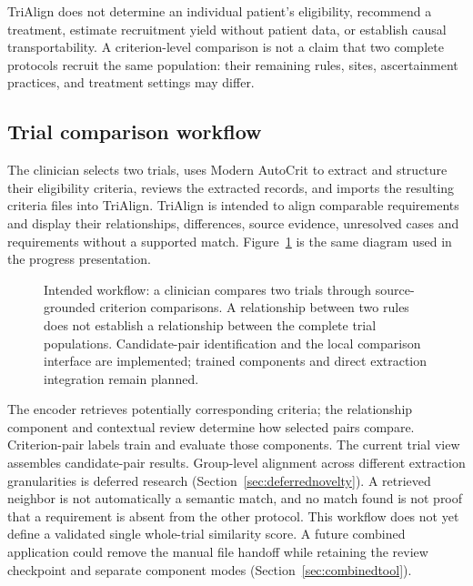 \documentclass[10pt,letterpaper]{article}
\begin{document}
TriAlign does not determine an individual patient's eligibility, recommend a
treatment, estimate recruitment yield without patient data, or establish
causal transportability. A criterion-level comparison is not a claim that
two complete protocols recruit the same population: their remaining rules,
sites, ascertainment practices, and treatment settings may differ.

\subsection{Trial comparison workflow}
\label{sec:trialworkflow}
The clinician selects two trials, uses Modern AutoCrit to extract and
structure their eligibility criteria, reviews the extracted records, and
imports the resulting criteria files into TriAlign. TriAlign is intended to
align comparable requirements and display their relationships, differences,
source evidence, unresolved cases and requirements without a supported
match. Figure~\ref{fig:trialworkflow} is the same diagram used in the progress
presentation.

\begin{figure}[htbp]
\centering
{}
\caption{Intended workflow: a clinician compares two trials through
source-grounded criterion comparisons. A relationship between two rules
does not establish a relationship between the complete trial populations.
Candidate-pair identification and the local comparison interface are implemented;
trained components and direct extraction integration remain planned.}
\label{fig:trialworkflow}
\end{figure}

The encoder retrieves potentially corresponding criteria; the relationship
component and contextual review determine how selected pairs compare.
Criterion-pair labels train and evaluate those components. The current trial view assembles candidate-pair results. Group-level alignment
across different extraction granularities is deferred research
(Section~\ref{sec:deferrednovelty}). A retrieved neighbor is not automatically
a semantic match, and no match found is not proof that a requirement is
absent from the other protocol. This workflow does not yet define a validated
single whole-trial similarity score. A future combined application could
remove the manual file handoff while retaining the review checkpoint and
separate component modes (Section~\ref{sec:combinedtool}).
\end{document}
